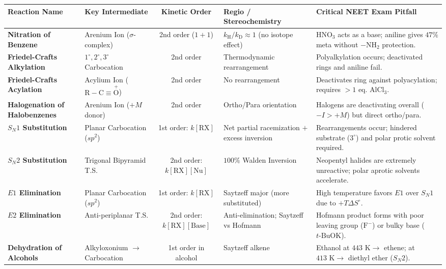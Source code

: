 \documentclass[10pt,twoside,openright]{book}
\begin{document}
\begin{center}
\scriptsize
\renewcommand{\arraystretch}{1.08}
{\scriptsize\setlength{\tabcolsep}{2.0pt}
\begin{tabularx}{\linewidth}{|L|L|c|L|L|}
\hline
\textbf{Reaction Name} & \textbf{Key Intermediate} & \textbf{Kinetic Order} & \textbf{Regio / Stereochemistry} & \textbf{Critical NEET Exam Pitfall} \\
\hline
\textbf{Nitration of Benzene} & Arenium Ion ($\sigma$-complex) & 2nd order ($1+1$) & $k_{\mathrm{H}}/k_{\mathrm{D}} \approx 1$ (no isotope effect) & $\mathrm{HNO_3}$ acts as a base; aniline gives $47\%$ meta without $-\mathrm{NH_2}$ protection. \\
\hline
\textbf{Friedel-Crafts Alkylation} & $1^\circ, 2^\circ, 3^\circ$ Carbocation & 2nd order & Thermodynamic rearrangement & Polyalkylation occurs; deactivated rings and aniline fail. \\
\hline
\textbf{Friedel-Crafts Acylation} & Acylium Ion ($\mathrm{R-C\equiv \overset{+}{O}}$) & 2nd order & No rearrangement & Deactivates ring against polyacylation; requires $>1$ eq. $\mathrm{AlCl_3}$. \\
\hline
\textbf{Halogenation of Halobenzenes} & Arenium Ion ($+M$ donor) & 2nd order & Ortho/Para orientation & Halogens are deactivating overall ($-I > +M$) but direct ortho/para. \\
\hline
\textbf{$S_N1$ Substitution} & Planar Carbocation ($sp^2$) & 1st order: $k[\mathrm{RX}]$ & Net partial racemization $+$ excess inversion & Rearrangements occur; hindered substrate ($3^\circ$) and polar protic solvent required. \\
\hline
\textbf{$S_N2$ Substitution} & Trigonal Bipyramid T.S. & 2nd order: $k[\mathrm{RX}][\mathrm{Nu}]$ & $100\%$ Walden Inversion & Neopentyl halides are extremely unreactive; polar aprotic solvents accelerate. \\
\hline
\textbf{$E1$ Elimination} & Planar Carbocation ($sp^2$) & 1st order: $k[\mathrm{RX}]$ & Saytzeff major (more substituted) & High temperature favors $E1$ over $S_N1$ due to $+T\Delta S^\circ$. \\
\hline
\textbf{$E2$ Elimination} & Anti-periplanar T.S. & 2nd order: $k[\mathrm{RX}][\mathrm{Base}]$ & Anti-elimination; Saytzeff vs Hofmann & Hofmann product forms with poor leaving group ($\mathrm{F}^-$) or bulky base ($t\text{-BuOK}$). \\
\hline
\textbf{Dehydration of Alcohols} & Alkyloxonium $\to$ Carbocation & 1st order in alcohol & Saytzeff alkene & Ethanol at $443\text{ K} \to$ ethene; at $413\text{ K} \to$ diethyl ether ($S_N2$). \\
\hline
\end{tabularx}}
\end{center}
\end{document}
